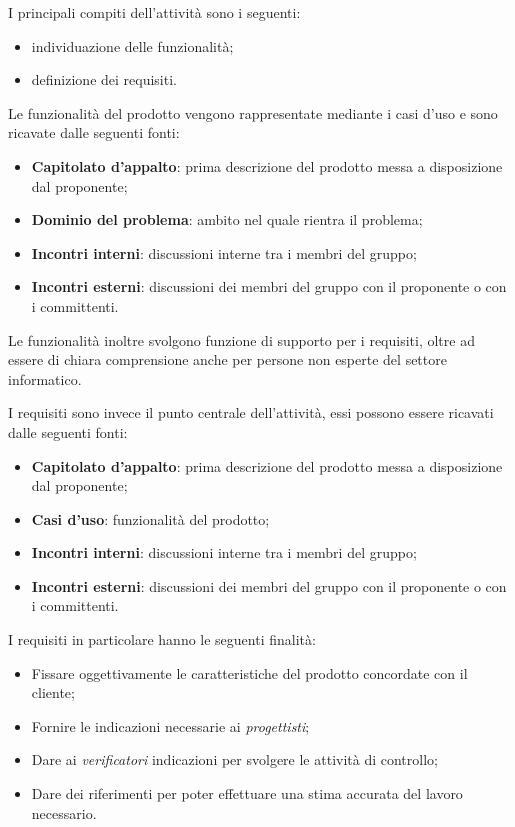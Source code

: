 I principali compiti dell'attività sono i seguenti:
\begin{itemize}
	\item individuazione delle funzionalità;
	\item definizione dei requisiti.
\end{itemize}

Le funzionalità del prodotto vengono rappresentate mediante i casi d'uso e sono ricavate dalle seguenti fonti:
\begin{itemize}
    \item \textbf{Capitolato d'appalto}: prima descrizione del prodotto messa a disposizione dal proponente;
    \item \textbf{Dominio del problema}: ambito nel quale rientra il problema;
    \item \textbf{Incontri interni}: discussioni interne tra i membri del gruppo;
    \item \textbf{Incontri esterni}: discussioni dei membri del gruppo con il proponente o con i committenti.
\end{itemize}
Le funzionalità inoltre svolgono funzione di supporto per i requisiti, oltre ad essere 
di chiara comprensione anche per persone non esperte del settore informatico.

I requisiti sono invece il punto centrale dell'attività, essi possono essere ricavati dalle seguenti fonti:
\begin{itemize}
    \item \textbf{Capitolato d'appalto}: prima descrizione del prodotto messa a disposizione dal proponente;
    \item \textbf{Casi d'uso}: funzionalità del prodotto;
    \item \textbf{Incontri interni}: discussioni interne tra i membri del gruppo;
    \item \textbf{Incontri esterni}: discussioni dei membri del gruppo con il proponente o con i committenti.
\end{itemize}

I requisiti in particolare hanno le seguenti finalità:
\begin{itemize}
    \item Fissare oggettivamente le caratteristiche del prodotto concordate con il cliente;
    \item Fornire le indicazioni necessarie ai \emph{progettisti};
    \item Dare ai \emph{verificatori} indicazioni per svolgere le attività di controllo;
    \item Dare dei riferimenti per poter effettuare una stima accurata del lavoro necessario.
\end{itemize}

